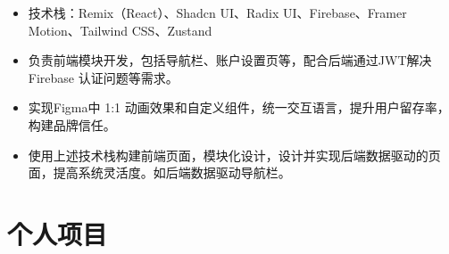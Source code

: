 \documentclass{resume}
\newcommand{\en}[1]{}
\newcommand{\zh}[1]{#1}
\begin{document}
\en{\datedsubsection{\textbf{\href{https://www.trychad.com/}{Chad}}}{}}
\zh{}
\en{\role{Front-End Engineer}{}}
\zh{}
\begin{itemize}
    \item \en{Tech stack: Remix (React), Shadcn UI, Radix UI, Firebase, Framer Motion, Tailwind CSS, Zustand}
          \zh{技术栈：Remix（React）、Shadcn UI、Radix UI、Firebase、Framer Motion、Tailwind CSS、Zustand}
    \item \en{Developed frontend modules including navigation bars and account settings pages, collaborating with backend team to implement Firebase JWT authentication and resolve related authentication requirements.}
          \zh{负责前端模块开发，包括导航栏、账户设置页等，配合后端通过JWT解决 Firebase 认证问题等需求。}
    \item \en{Implemented pixel-perfect animations and custom components from Figma designs, unifying interaction language to improve user retention and build brand trust.}
          \zh{实现Figma中 1:1 动画效果和自定义组件，统一交互语言，提升用户留存率，构建品牌信任。}
    \item \en{Built modular frontend pages using the above tech stack, designing and implementing backend data-driven pages to increase system flexibility, such as a backend-driven navigation bar.}
          \zh{使用上述技术栈构建前端页面，模块化设计，设计并实现后端数据驱动的页面，提高系统灵活度。如后端数据驱动导航栏。}
\end{itemize}

\section{\en{Portfolios}\zh{个人项目}}
\end{document}
